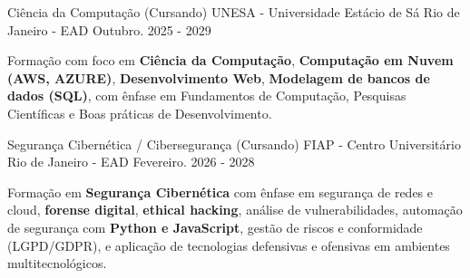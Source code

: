 

\begin{cventries}

  \cventry
    {Ciência da Computação (Cursando)} %
    {UNESA - Universidade Estácio de Sá} %
    {Rio de Janeiro - EAD} %
    {Outubro. 2025 - 2029} %
    {
      \begin{cvitems} %
	\item {Formação com foco em \textbf{Ciência da Computação}, \textbf{Computação em Nuvem (AWS, AZURE)}, \textbf{Desenvolvimento Web}, \textbf{Modelagem de bancos de dados (SQL)}, com ênfase em Fundamentos de Computação, Pesquisas Científicas e Boas práticas de Desenvolvimento.}
      \end{cvitems}
    }

  \cventry
    {Segurança Cibernética /  Cibersegurança  (Cursando)} %
    {FIAP -  Centro Universitário} %
    {Rio de Janeiro - EAD} %
    {Fevereiro. 2026 - 2028} %
    {
      \begin{cvitems} %
	\item {Formação em \textbf{Segurança Cibernética} com ênfase em segurança de redes e cloud, \textbf{forense digital}, \textbf{ethical hacking}, análise de vulnerabilidades, automação de segurança com \textbf{Python e JavaScript}, gestão de riscos e conformidade (LGPD/GDPR), e aplicação de tecnologias defensivas e ofensivas em ambientes multitecnológicos.}
      \end{cvitems}
    }

\end{cventries}
